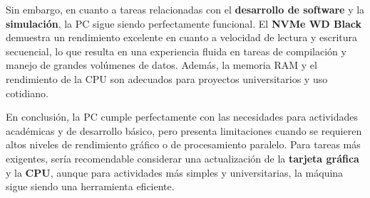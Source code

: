 Sin embargo, en cuanto a tareas relacionadas con el \textbf{desarrollo de software} y la \textbf{simulación}, la PC sigue siendo perfectamente funcional. El \textbf{NVMe WD Black} demuestra un rendimiento excelente en cuanto a velocidad de lectura y escritura secuencial, lo que resulta en una experiencia fluida en tareas de compilación y manejo de grandes volúmenes de datos. Además, la memoria RAM y el rendimiento de la CPU son adecuados para proyectos universitarios y uso cotidiano.

En conclusión, la PC cumple perfectamente con las necesidades para actividades académicas y de desarrollo básico, pero presenta limitaciones cuando se requieren altos niveles de rendimiento gráfico o de procesamiento paralelo. Para tareas más exigentes, sería recomendable considerar una actualización de la \textbf{tarjeta gráfica} y la \textbf{CPU}, aunque para actividades más simples y universitarias, la máquina sigue siendo una herramienta eficiente.
